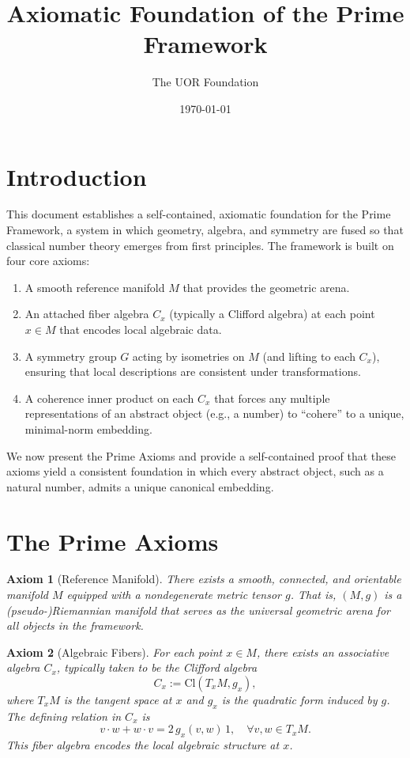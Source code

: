 \documentclass[12pt]{article}
\title{Axiomatic Foundation of the Prime Framework}
\author{The UOR Foundation}
\date{\today}
\newtheorem{axiom}{Axiom}[section]
\begin{document}
\maketitle

\section{Introduction}
This document establishes a self-contained, axiomatic foundation for the Prime Framework, a system in which geometry, algebra, and symmetry are fused so that classical number theory emerges from first principles. The framework is built on four core axioms:
\begin{enumerate}
  \item A smooth reference manifold \(M\) that provides the geometric arena.
  \item An attached fiber algebra \(C_x\) (typically a Clifford algebra) at each point \(x\in M\) that encodes local algebraic data.
  \item A symmetry group \(G\) acting by isometries on \(M\) (and lifting to each \(C_x\)), ensuring that local descriptions are consistent under transformations.
  \item A coherence inner product on each \(C_x\) that forces any multiple representations of an abstract object (e.g., a number) to ``cohere'' to a unique, minimal-norm embedding.
\end{enumerate}
We now present the Prime Axioms and provide a self-contained proof that these axioms yield a consistent foundation in which every abstract object, such as a natural number, admits a unique canonical embedding.

\section{The Prime Axioms}

\begin{axiom}[Reference Manifold]
There exists a smooth, connected, and orientable manifold \(M\) equipped with a nondegenerate metric tensor \(g\). That is, \((M, g)\) is a (pseudo-)Riemannian manifold that serves as the universal geometric arena for all objects in the framework.
\end{axiom}

\begin{axiom}[Algebraic Fibers]
For each point \(x \in M\), there exists an associative algebra \(C_x\), typically taken to be the Clifford algebra
\[
C_x := \mathrm{Cl}(T_xM, g_x),
\]
where \(T_xM\) is the tangent space at \(x\) and \(g_x\) is the quadratic form induced by \(g\). The defining relation in \(C_x\) is
\[
v \cdot w + w \cdot v = 2\,g_x(v,w)\,1, \quad \forall v, w \in T_xM.
\]
This fiber algebra encodes the local algebraic structure at \(x\).
\end{axiom}
\end{document}

